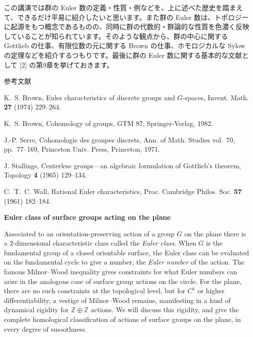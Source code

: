\documentclass[uplatex,dvipdfmx]{jlreq}
\newcommand{\Z}{\mathbb{Z}}
\begin{document}
この講演では群の Euler 数の定義・性質・例などを、上に述べた歴史を踏まえて、できるだけ平易に紹介したいと思います。また群の Euler 数は、トポロジーに起源をもつ概念であるものの、同時に群の代数的・群論的な性質を色濃く反映していることが知られています。そのような観点から、群の中心に関する Gottlieb の仕事、有限位数の元に関する Brown の仕事、ホモロジカルな Sylow の定理などを紹介するつもりです。最後に群の Euler 数に関する基本的な文献として [2] の第9章を挙げておきます。

\begin{center}\textsc{参考文献}\end{center}
\begin{enumerate}[{[1]}]
  \item K.~S. Brown, Euler characteristics of discrete groups and $G$-spaces, Invent. Math. \textbf{27} (1974) 229--264.
  \item K.~S. Brown, Cohomology of groups, GTM 87, Springer-Verlag, 1982.
  \item J.-P. Serre, Cohomologie des groupes discrets, Ann. of Math. Studies vol.~70, pp.~77--169, Princeton Univ. Press, Princeton, 1971.
  \item J. Stallings, Centerless groups---an algebraic formulation of Gottlieb's theorem, Topology \textbf{4} (1965) 129--134.
  \item C.~T.~C. Wall, Rational Euler characteristics, Proc. Cambridge Philos. Soc. \textbf{57} (1961) 182--184.
\end{enumerate}

\newpage

\begin{center}
{\large\bfseries Euler class of surface groups acting on the plane}\\[6pt]
\hspace*{\fill}{\large\bfseries Danny Calegari (Caltech／東工大・情報理工)}
\end{center}

Associated to an orientation-preserving action of a group $G$ on the plane there is a $2$-dimensional characteristic class called the \emph{Euler class}. When $G$ is the fundamental group of a closed orientable surface, the Euler class can be evaluated on the fundamental cycle to give a number, the \emph{Euler number} of the action. The famous Milnor--Wood inequality gives constraints for what Euler numbers can arise in the analogous case of surface group actions on the circle. For the plane, there are no such constraints at the topological level, but for $C^1$ or higher differentiability, a vestige of Milnor--Wood remains, manifesting in a kind of dynamical rigidity for $\Z \oplus \Z$ actions. We will discuss this rigidity, and give the complete homological classification of actions of surface groups on the plane, in every degree of smoothness.
\end{document}
